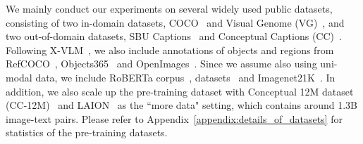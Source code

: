 \documentclass[11pt]{article}
\begin{document}
We mainly conduct our experiments on several widely used public datasets, 
consisting of two in-domain datasets, COCO~\cite{lin2014microsoft} and Visual Genome (VG)~\cite{krishna2016visual}, and two out-of-domain datasets, SBU Captions~\cite{ordonez2011im2text} and Conceptual Captions (CC)~\cite{sharma2018conceptual}. Following X-VLM~\citep{zeng2021multi,zeng2022x}, we also include annotations of objects and regions from RefCOCO~\cite{yu2016modeling}, Objects365~\cite{shao2019objects365} and OpenImages~\cite{kuznetsova2018open}. Since we assume also using uni-modal data, we include RoBERTa corpus~\citep{liu2019roberta},  datasets~\citep{raffel2020exploring} and Imagenet21K~\citep{ridnik2021imagenet21k}. In addition, we also scale up the pre-training dataset with Conceptual 12M dataset (CC-12M)~\cite{changpinyo2021conceptual} and LAION~\cite{schuhmann2022laion} as the ``more data" setting, which contains around 1.3B image-text pairs. Please refer to Appendix~\ref{appendix:details_of_datasets} for statistics of the pre-training datasets.
\end{document}
